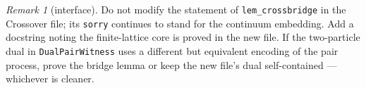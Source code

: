 \documentclass[11pt]{article}
\theoremstyle{plain}
\theoremstyle{remark}
\newtheorem{remark}{Remark}
\begin{document}
\begin{remark}[interface]
Do not modify the statement of \texttt{lem\_crossbridge} in the Crossover file; its
\texttt{sorry} continues to stand for the continuum embedding. Add a docstring
noting the finite-lattice core is proved in the new file. If the two-particle dual
in \texttt{DualPairWitness} uses a different but equivalent encoding of the pair
process, prove the bridge lemma or keep the new file's dual self-contained ---
whichever is cleaner.
\end{remark}
\end{document}

